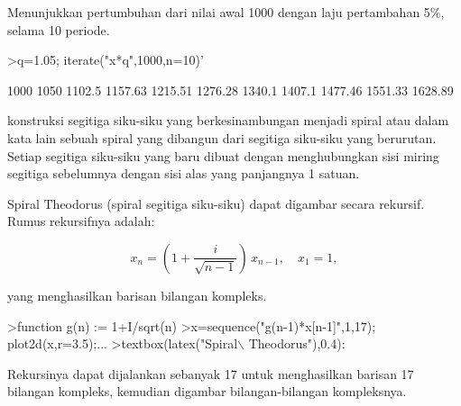 \documentclass[a4paper,10pt]{article}
\begin{document}
\begin{eulernotebook}
\begin{eulercomment}
\begin{eulercomment}
\begin{eulercomment}
\begin{eulercomment}
\begin{eulercomment}
\begin{eulercomment}
\begin{eulercomment}
\begin{eulercomment}
\begin{eulercomment}
\begin{eulercomment}
\begin{eulercomment}
\begin{eulercomment}
\begin{eulercomment}
\begin{eulercomment}
\begin{eulercomment}
\begin{eulercomment}
\begin{eulercomment}
\begin{eulercomment}
\begin{eulercomment}
\begin{eulercomment}
\begin{eulercomment}
\begin{eulercomment}
\begin{eulercomment}
\begin{eulercomment}
\begin{eulercomment}
Menunjukkan pertumbuhan dari nilai awal 1000 dengan laju pertambahan
5\%, selama 10 periode.
\end{eulercomment}
\begin{eulerprompt}
>q=1.05; iterate("x*q",1000,n=10)'
\end{eulerprompt}
\begin{euleroutput}
           1000 
           1050 
         1102.5 
        1157.63 
        1215.51 
        1276.28 
         1340.1 
         1407.1 
        1477.46 
        1551.33 
        1628.89 
\end{euleroutput}
\begin{eulercomment}
konstruksi segitiga siku-siku yang berkesinambungan menjadi spiral
atau dalam kata lain sebuah spiral yang dibangun dari segitiga
siku-siku yang berurutan. Setiap segitiga siku-siku yang baru dibuat
dengan menghubungkan sisi miring segitiga sebelumnya dengan sisi alas
yang panjangnya 1 satuan.

Spiral Theodorus (spiral segitiga siku-siku) dapat digambar secara
rekursif. Rumus rekursifnya adalah:

\end{eulercomment}
\begin{eulerformula}
\[
x_n = \left( 1 + \frac{i}{\sqrt{n-1}} \right) \, x_{n-1}, \quad x_1=1,
\]
\end{eulerformula}
\begin{eulercomment}
yang menghasilkan barisan bilangan kompleks.
\end{eulercomment}
\begin{eulerprompt}
>function g(n) := 1+I/sqrt(n)
>x=sequence("g(n-1)*x[n-1]",1,17); plot2d(x,r=3.5);...
>textbox(latex("Spiral\(\backslash\) Theodorus"),0.4):
\end{eulerprompt}
\begin{eulercomment}
Rekursinya dapat dijalankan sebanyak 17 untuk menghasilkan barisan 17
bilangan kompleks, kemudian digambar bilangan-bilangan kompleksnya.


\end{eulercomment}
\end{eulercomment}
\end{eulercomment}
\end{eulercomment}
\end{eulercomment}
\end{eulercomment}
\end{eulercomment}
\end{eulercomment}
\end{eulercomment}
\end{eulercomment}
\end{eulercomment}
\end{eulercomment}
\end{eulercomment}
\end{eulercomment}
\end{eulercomment}
\end{eulercomment}
\end{eulercomment}
\end{eulercomment}
\end{eulercomment}
\end{eulercomment}
\end{eulercomment}
\end{eulercomment}
\end{eulercomment}
\end{eulercomment}
\end{eulercomment}
\end{eulernotebook}
\end{document}
